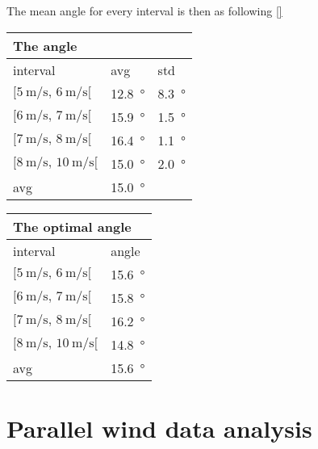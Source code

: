  
The mean angle for every interval is then as following \autoref{}

  \begin{table}[H]
 \centering
\begin{tabular}{l|l|l}
\multicolumn{2}{l}{The angle}      \\ \hline
interval & avg & std \\ \hline
  $[\SI{5}{\meter\per\second},\, \SI{6}{\meter\per\second}[ $       &   \SI{12.8}{\degree} &   \SI{8.3}{\degree}   \\
    $[\SI{6}{\meter\per\second},\, \SI{7}{\meter\per\second}[ $     &   \SI{15.9}{\degree} &   \SI{1.5}{\degree}    \\
  $[\SI{7}{\meter\per\second},\, \SI{8}{\meter\per\second}[ $       &    \SI{16.4}{\degree}  &   \SI{1.1}{\degree}  \\
   $[\SI{8}{\meter\per\second},\, \SI{10}{\meter\per\second}[ $      &     \SI{15.0}{\degree}  &   \SI{2.0}{\degree}  \\ \hline
    avg      &     \SI{15.0}{\degree} &
\end{tabular}
\end{table}  
 

 
 \begin{table}[H]
 \centering
\begin{tabular}{l|l}
\multicolumn{2}{l}{The optimal angle}      \\ \hline
interval & angle \\ \hline
  $[\SI{5}{\meter\per\second},\, \SI{6}{\meter\per\second}[ $       &   \SI{15.6}{\degree}    \\
    $[\SI{6}{\meter\per\second},\, \SI{7}{\meter\per\second}[ $     &   \SI{15.8}{\degree}     \\
  $[\SI{7}{\meter\per\second},\, \SI{8}{\meter\per\second}[ $       &    \SI{16.2}{\degree}    \\
   $[\SI{8}{\meter\per\second},\, \SI{10}{\meter\per\second}[ $      &     \SI{14.8}{\degree}  \\ \hline
    avg      &     \SI{15.6}{\degree} 
\end{tabular}
\end{table}     
 

\section{Parallel wind data analysis}\label{res:par_data_ana}

